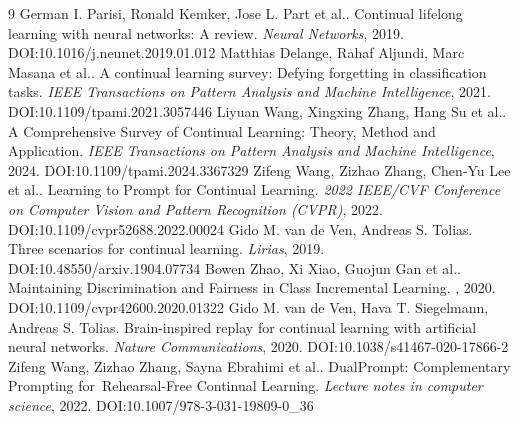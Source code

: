 \documentclass[11pt]{article}
\begin{document}
\begin{thebibliography}{9}
 German I. Parisi, Ronald Kemker, Jose L. Part et al.. Continual lifelong learning with neural networks: A review. \emph{Neural Networks}, 2019. DOI:10.1016/j.neunet.2019.01.012
 Matthias Delange, Rahaf Aljundi, Marc Masana et al.. A continual learning survey: Defying forgetting in classification tasks. \emph{IEEE Transactions on Pattern Analysis and Machine Intelligence}, 2021. DOI:10.1109/tpami.2021.3057446
 Liyuan Wang, Xingxing Zhang, Hang Su et al.. A Comprehensive Survey of Continual Learning: Theory, Method and Application. \emph{IEEE Transactions on Pattern Analysis and Machine Intelligence}, 2024. DOI:10.1109/tpami.2024.3367329
 Zifeng Wang, Zizhao Zhang, Chen‐Yu Lee et al.. Learning to Prompt for Continual Learning. \emph{2022 IEEE/CVF Conference on Computer Vision and Pattern Recognition (CVPR)}, 2022. DOI:10.1109/cvpr52688.2022.00024
 Gido M. van de Ven, Andreas S. Tolias. Three scenarios for continual learning. \emph{Lirias}, 2019. DOI:10.48550/arxiv.1904.07734
 Bowen Zhao, Xi Xiao, Guojun Gan et al.. Maintaining Discrimination and Fairness in Class Incremental Learning. \emph{}, 2020. DOI:10.1109/cvpr42600.2020.01322
 Gido M. van de Ven, Hava T. Siegelmann, Andreas S. Tolias. Brain-inspired replay for continual learning with artificial neural networks. \emph{Nature Communications}, 2020. DOI:10.1038/s41467-020-17866-2
 Zifeng Wang, Zizhao Zhang, Sayna Ebrahimi et al.. DualPrompt: Complementary Prompting for Rehearsal-Free Continual Learning. \emph{Lecture notes in computer science}, 2022. DOI:10.1007/978-3-031-19809-0\_36
\end{thebibliography}
\end{document}
